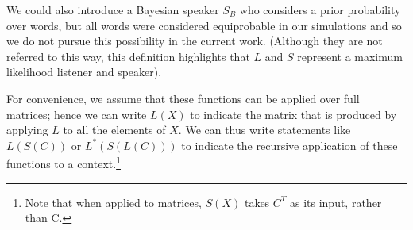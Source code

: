 We could also introduce a Bayesian speaker $S_B$ who considers a prior probability over words, but all words were considered equiprobable in our simulations and so we do not pursue this possibility in the current work. (Although they are not referred to this way, this definition highlights that $L$ and $S$ represent a maximum likelihood listener and speaker). 

For convenience, we assume that these functions can be applied over full matrices; hence we can write $L(X)$ to indicate the matrix that is produced by applying $L$ to all the elements of $X$. We can thus write statements like $L(S(C))$ or $L^*(S(L(C)))$ to indicate the recursive application of these functions to a context.\footnote{Note that when applied to matrices, $S(X)$ takes $C^T$ as its input, rather than C.}





